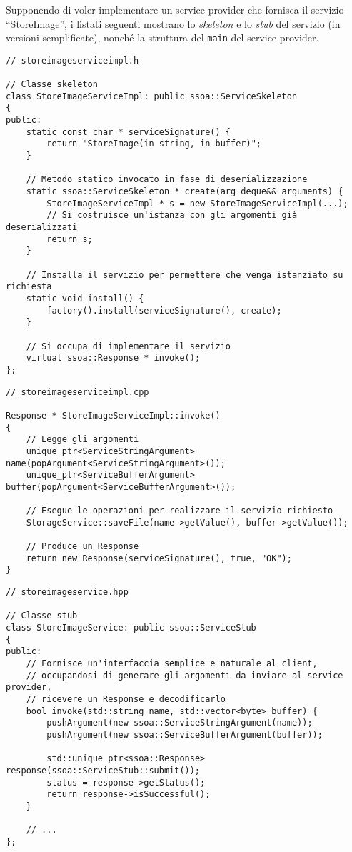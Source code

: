 \documentclass[a4paper,twoside]{article}
\newcommand*\file{\texttt}
\begin{document}
Supponendo di voler implementare un service provider che fornisca il servizio “StoreImage”, i listati seguenti mostrano lo \emph{skeleton} e lo \emph{stub} del servizio (in versioni semplificate), nonché la struttura del \file{main} del service provider.

\begin{lstlisting}
// storeimageserviceimpl.h

// Classe skeleton
class StoreImageServiceImpl: public ssoa::ServiceSkeleton
{
public:
    static const char * serviceSignature() {
        return "StoreImage(in string, in buffer)";
    }

    // Metodo statico invocato in fase di deserializzazione
    static ssoa::ServiceSkeleton * create(arg_deque&& arguments) {
        StoreImageServiceImpl * s = new StoreImageServiceImpl(...);
        // Si costruisce un'istanza con gli argomenti già deserializzati
        return s;
    }

    // Installa il servizio per permettere che venga istanziato su richiesta
    static void install() {
        factory().install(serviceSignature(), create);
    }

    // Si occupa di implementare il servizio
    virtual ssoa::Response * invoke();
};
\end{lstlisting}

\begin{lstlisting}
// storeimageserviceimpl.cpp

Response * StoreImageServiceImpl::invoke()
{
    // Legge gli argomenti
    unique_ptr<ServiceStringArgument> name(popArgument<ServiceStringArgument>());
    unique_ptr<ServiceBufferArgument> buffer(popArgument<ServiceBufferArgument>());

    // Esegue le operazioni per realizzare il servizio richiesto
    StorageService::saveFile(name->getValue(), buffer->getValue());

    // Produce un Response
    return new Response(serviceSignature(), true, "OK");
}
\end{lstlisting}


\begin{lstlisting}
// storeimageservice.hpp

// Classe stub
class StoreImageService: public ssoa::ServiceStub
{
public:
    // Fornisce un'interfaccia semplice e naturale al client,
    // occupandosi di generare gli argomenti da inviare al service provider,
    // ricevere un Response e decodificarlo
    bool invoke(std::string name, std::vector<byte> buffer) {
        pushArgument(new ssoa::ServiceStringArgument(name));
        pushArgument(new ssoa::ServiceBufferArgument(buffer));

        std::unique_ptr<ssoa::Response> response(ssoa::ServiceStub::submit());
        status = response->getStatus();
        return response->isSuccessful();
    }

    // ...
};
\end{lstlisting}
\end{document}

